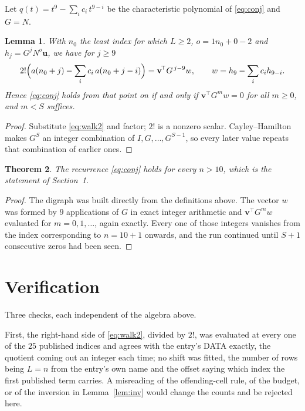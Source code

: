 \documentclass[11pt,a4paper]{article}
\theoremstyle{plain}
\newtheorem{theorem}{Theorem}
\newtheorem{lemma}[theorem]{Lemma}
\theoremstyle{definition}
\begin{document}
Let $q(t)=t^{9}-\sum_i c_i\,t^{9-i}$ be the characteristic polynomial of
\eqref{eq:conj} and $G=N$.

\begin{lemma}\label{lem:crit}
With $n_0$ the least index for which $L\ge2$, $o=1n_0+0-2$ and
$h_j=G^{j}N^{o}\mathbf{u}$, we have for $j\ge9$
\[
2!\Bigl(a(n_0+j)-\sum_i c_i\,a(n_0+j-i)\Bigr)=\mathbf{v}^{\!\top}G^{\,j-9}w,
\qquad w=h_{9}-\sum_i c_i h_{9-i} .
\]
Hence \eqref{eq:conj} holds from that point on if and only if
$\mathbf{v}^{\!\top}G^{m}w=0$ for all $m\ge0$, and $m<S$ suffices.
\end{lemma}

\begin{proof}
Substitute \eqref{eq:walk2} and factor; $2!$ is a nonzero scalar. Cayley--Hamilton
makes $G^{S}$ an integer combination of $I,G,\dots,G^{S-1}$, so every later value repeats
that combination of earlier ones.
\end{proof}

\begin{theorem}
The recurrence \eqref{eq:conj} holds for every $n>10$, which is the statement of
Section~1.
\end{theorem}

\begin{proof}
The digraph was built directly from the definitions above. The vector $w$ was formed by
$9$ applications of $G$ in exact integer arithmetic and $\mathbf{v}^{\!\top}G^{m}w$
evaluated for $m=0,1,\dots$, again exactly. Every one of those integers vanishes from the
index corresponding to $n=10+1$ onwards, and the run continued until $S+1$ consecutive
zeros had been seen.
\end{proof}

\section{Verification}

Three checks, each independent of the algebra above.

First, the right-hand side of \eqref{eq:walk2}, divided by $2!$, was evaluated at every
one of the $25$ published indices and agrees with the entry's DATA exactly, the quotient
coming out an integer each time; no shift was fitted, the number of rows being
$L=n$ from the entry's own name and the offset saying which index the first published
term carries. A misreading of the offending-cell rule, of the budget, or of the inversion in
Lemma~\ref{lem:inv} would change the counts and be rejected here.
\end{document}
